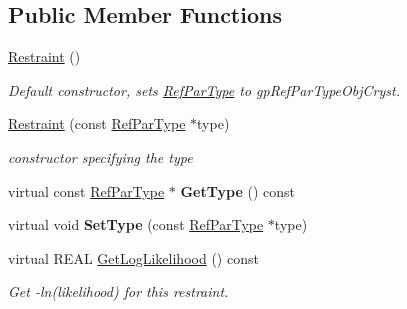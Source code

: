\subsection*{Public Member Functions}
\begin{DoxyCompactItemize}
\item 
\mbox{\label{class_obj_cryst_1_1_restraint_ac916c489ee14891b38bf9a877d9e0d03}} 
\mbox{\hyperlink{class_obj_cryst_1_1_restraint_ac916c489ee14891b38bf9a877d9e0d03}{Restraint}} ()
\begin{DoxyCompactList}\small\item\em Default constructor, sets \mbox{\hyperlink{class_obj_cryst_1_1_ref_par_type}{Ref\+Par\+Type}} to gp\+Ref\+Par\+Type\+Obj\+Cryst. \end{DoxyCompactList}\item 
\mbox{\label{class_obj_cryst_1_1_restraint_a5fd37c4a5f20a41dcacb78b0af3b8a7d}} 
\mbox{\hyperlink{class_obj_cryst_1_1_restraint_a5fd37c4a5f20a41dcacb78b0af3b8a7d}{Restraint}} (const \mbox{\hyperlink{class_obj_cryst_1_1_ref_par_type}{Ref\+Par\+Type}} $\ast$type)
\begin{DoxyCompactList}\small\item\em constructor specifying the type \end{DoxyCompactList}\item 
\mbox{\label{class_obj_cryst_1_1_restraint_a7d9bf75d4d7a83fdf3c5f4b44bb4e7e7}} 
virtual const \mbox{\hyperlink{class_obj_cryst_1_1_ref_par_type}{Ref\+Par\+Type}} $\ast$ {\bfseries Get\+Type} () const
\item 
\mbox{\label{class_obj_cryst_1_1_restraint_a61f0346a4896caa89ac880a76a632882}} 
virtual void {\bfseries Set\+Type} (const \mbox{\hyperlink{class_obj_cryst_1_1_ref_par_type}{Ref\+Par\+Type}} $\ast$type)
\item 
\mbox{\label{class_obj_cryst_1_1_restraint_ab2b50e5b6209b0443b6d746aa4ac2ffd}} 
virtual R\+E\+AL \mbox{\hyperlink{class_obj_cryst_1_1_restraint_ab2b50e5b6209b0443b6d746aa4ac2ffd}{Get\+Log\+Likelihood}} () const
\begin{DoxyCompactList}\small\item\em Get -\/ln(likelihood) for this restraint. \end{DoxyCompactList}\end{DoxyCompactItemize}


